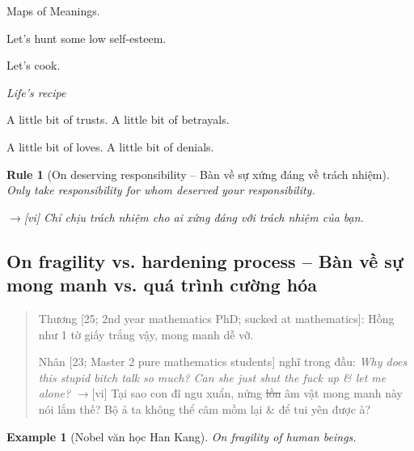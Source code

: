 \documentclass[12pt,oneside]{book}
\newtheorem{example}{Example}
\newtheorem{Rule}{Rule}
\begin{document}
Maps of Meanings.

Let's hunt some low self-esteem.

Let's cook.

\begin{center}\it
	{\sc Life's recipe}
	
	A little bit of trusts. A little bit of betrayals.
	
	A little bit of loves. A little bit of denials.
\end{center}

\begin{Rule}[On deserving responsibility -- Bàn về sự xứng đáng về trách nhiệm] 
	Only take responsibility for whom deserved your responsibility.
	
	{\sf[en]$\to$[vi]} Chỉ chịu trách nhiệm cho ai xứng đáng với trách nhiệm của bạn.
\end{Rule}

\subsection{On fragility vs. hardening process -- Bàn về sự mong manh vs. quá trình cường hóa}

\begin{quote}
	{\sf Thương [25; 2nd year mathematics PhD; sucked at mathematics]}: Hồng như 1 tờ giấy trắng vậy, mong manh dễ vỡ.
	
	{\sf Nhân [23; Master 2 pure mathematics students]} nghĩ trong đầu: {\it Why does this stupid bitch talk so much? Can she just shut the fuck up \& let me alone?} {\sf[en]$\to$[vi]} Tại sao con đĩ ngu xuẩn, nứng \st{lồn} âm vật mong manh này nói lắm thế? Bộ ả ta không thể câm mồm lại \& để tui yên được à?
\end{quote}

\begin{example}[Nobel văn học Han Kang]
	On fragility of human beings.
\end{example}
\end{document}
